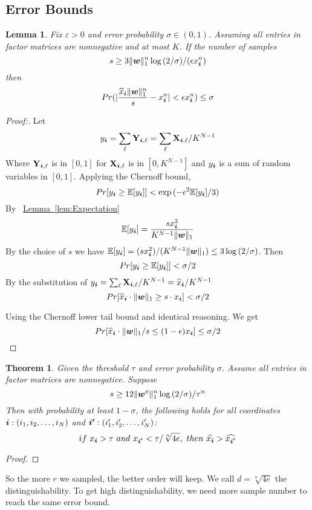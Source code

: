 \documentclass[letterpaper]{article}
\newcommand{\V}[1]{{\bm{{\MakeLowercase{#1}}}}}
\newcommand{\M}[1]{{\bm{\mathbf{\MakeUppercase{#1}}}}}
\newcommand{\norm}[2]{\|#1\|_{#2}}
\newcommand{\Lem}[1] {\hyperref[lem:#1] {Lemma~\ref*{lem:#1}}} %
\newtheorem{lemma}{Lemma}
\newtheorem{theorem}{Theorem}
\begin{document}
\subsection{Error Bounds}
\begin{lemma}\label{lem:Bound}
Fix $\varepsilon > 0$ and error probability $\sigma \in (0,1)$. Assuming all entries in factor matrices are nonnegative and at most $K$. If the number of samples
\[
s \geq 3\norm{\V{w}}{1}^n\log{(2/\sigma)}/(\epsilon x^n_{\V{i}})
\]
then
\[
Pr(|\frac{\widehat{x}_\V{i}\norm{\V{w}}{1}^n}{s} - x^n_{\V{i}}| < \epsilon x^n_{\V{i}}) \leq \sigma
\]
\end{lemma}

\begin{proof}[Proof:]
Let
\[
    y_{\V{i}} = \sum_{\ell}\M{Y}_{\V{i},\ell} = \sum_{\ell}\M{X}_{\V{i},\ell}/K^{N-1}
\]
Where $\M{Y}_{\V{i},\ell}$ is in $[0,1]$ for $\M{X}_{\V{i},\ell}$ is in $[0,K^{N-1}]$ and $y_{\V{i}}$ is a sum of random variables in $[0,1]$.
Applying the Chernoff bound,
\[
Pr[y_{\V{i}} \geq \mathbb{E}[y_{\V{i}}]] < \exp{(-\epsilon^2\mathbb{E}[y_{\V{i}}]/3)}
\]
By ~\Lem{Expectation}
\[
\mathbb{E}[y_{\V{i}}] = \frac{sx^2_{\V{i}}}{K^{N-1}\norm{\V{W}}{1}}
\]
By the choice of $s$ we have $\mathbb{E}[y_{\V{i}}]=(sx^2_{\V{i}})/(K^{N-1}\norm{\V{W}}{1}) \leq 3\log{(2/\sigma)}$. Then
\[
Pr[y_{\V{i}} \geq \mathbb{E}[y_{\V{i}}]] < \sigma/2
\]
By the substitution of $y_{\V{i}}=\sum_{\ell}\M{X}_{\V{i},\ell}/K^{N-1}=\widehat{x}_{\V{i}}/K^{N-1}$
\[
Pr[\widehat{x}_{\V{i}}\cdot\norm{\V{W}}{1} \geq s\cdot x_{\V{i}}] < \sigma/2
\]

Using the Chernoff lower tail bound and identical reasoning. We get
\[
Pr[\widehat{x}_{\V{i}}\cdot\norm{\V{W}}{1}/s \leq (1-\epsilon)x_{\V{i}}] \leq \sigma/2
\]
\end{proof}

\begin{theorem}\label{theo:Order}
Given the threshold $\tau$ and error probability $\sigma$. 
Assume all entries in factor matrices are nonnegative. Suppose
\[
    s \geq 12\norm{\V{w^c}}{1}^n\log{(2/\sigma)}/\tau^n
\]
Then with probability at least $1-\sigma$,
the following holds for all coordinates $\V{i}:(i_1,i_2,\ldots,i_N)$ 
and $\V{i'}:(i'_1,i'_2,\ldots,i'_N)$:
\[
    if\ x_{\V{i}} > \tau\ and \ x_{\V{i'}} < \tau/\sqrt[n]{4e}, \ then\ \widehat{x_{\V{i}}} > \widehat{x_{\V{i'}}}
\]
\end{theorem}

\begin{proof}

\end{proof}
So the more $r$ we sampled, the better order will keep. 
We call $d=\sqrt[n]{4e}$ the distinguishability.
To get high distinguishability, we need more sample number to reach the same error bound.
\end{document}
